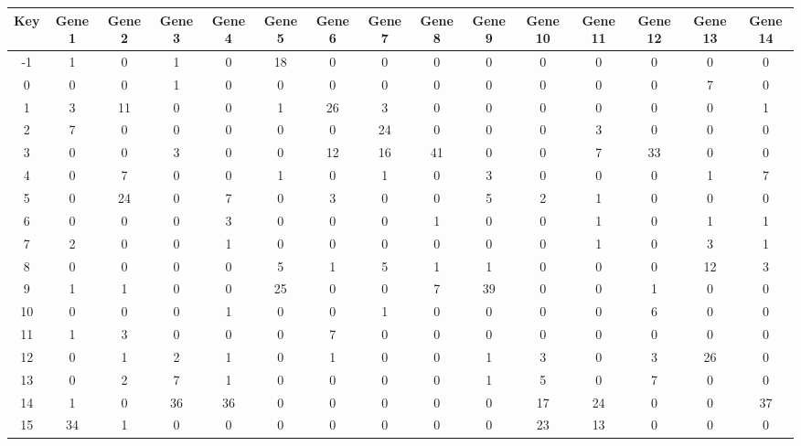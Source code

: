 \begin{tabular}{|c|c|c|c|c|c|c|c|c|c|c|c|c|c|c|}
\hline
Key & Gene 1 & Gene 2 & Gene 3 & Gene 4 & Gene 5 & Gene 6 & Gene 7 & Gene 8 & Gene 9 & Gene 10 & Gene 11 & Gene 12 & Gene 13 & Gene 14 \\
\hline
-1 & 1 & 0 & 1 & 0 & 18 & 0 & 0 & 0 & 0 & 0 & 0 & 0 & 0 & 0 \\
0 & 0 & 0 & 1 & 0 & 0 & 0 & 0 & 0 & 0 & 0 & 0 & 0 & 7 & 0 \\
1 & 3 & 11 & 0 & 0 & 1 & 26 & 3 & 0 & 0 & 0 & 0 & 0 & 0 & 1 \\
2 & 7 & 0 & 0 & 0 & 0 & 0 & 24 & 0 & 0 & 0 & 3 & 0 & 0 & 0 \\
3 & 0 & 0 & 3 & 0 & 0 & 12 & 16 & 41 & 0 & 0 & 7 & 33 & 0 & 0 \\
4 & 0 & 7 & 0 & 0 & 1 & 0 & 1 & 0 & 3 & 0 & 0 & 0 & 1 & 7 \\
5 & 0 & 24 & 0 & 7 & 0 & 3 & 0 & 0 & 5 & 2 & 1 & 0 & 0 & 0 \\
6 & 0 & 0 & 0 & 3 & 0 & 0 & 0 & 1 & 0 & 0 & 1 & 0 & 1 & 1 \\
7 & 2 & 0 & 0 & 1 & 0 & 0 & 0 & 0 & 0 & 0 & 1 & 0 & 3 & 1 \\
8 & 0 & 0 & 0 & 0 & 5 & 1 & 5 & 1 & 1 & 0 & 0 & 0 & 12 & 3 \\
9 & 1 & 1 & 0 & 0 & 25 & 0 & 0 & 7 & 39 & 0 & 0 & 1 & 0 & 0 \\
10 & 0 & 0 & 0 & 1 & 0 & 0 & 1 & 0 & 0 & 0 & 0 & 6 & 0 & 0 \\
11 & 1 & 3 & 0 & 0 & 0 & 7 & 0 & 0 & 0 & 0 & 0 & 0 & 0 & 0 \\
12 & 0 & 1 & 2 & 1 & 0 & 1 & 0 & 0 & 1 & 3 & 0 & 3 & 26 & 0 \\
13 & 0 & 2 & 7 & 1 & 0 & 0 & 0 & 0 & 1 & 5 & 0 & 7 & 0 & 0 \\
14 & 1 & 0 & 36 & 36 & 0 & 0 & 0 & 0 & 0 & 17 & 24 & 0 & 0 & 37 \\
15 & 34 & 1 & 0 & 0 & 0 & 0 & 0 & 0 & 0 & 23 & 13 & 0 & 0 & 0 \\
\hline
\end{tabular}